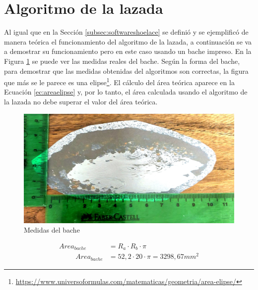 \section{Algoritmo de la lazada}
\label{sec:expshoelace}
Al igual que en la Sección \ref{subsec:softwareshoelace} se definió y se ejemplificó de manera teórica el funcionamiento del algoritmo de la lazada, a continuación se va a demostrar su funcionamiento pero en este caso usando un bache impreso. En la Figura \ref{fig:explazadamedidas} se puede ver las medidas reales del bache. Según la forma del bache, para demostrar que las medidas obtenidas del algoritmos son correctas, la figura que más se le parece es una elipse\footnote{\url{https://www.universoformulas.com/matematicas/geometria/area-elipse/}}. El cálculo del área teórica aparece en la Ecuación \ref{ec:areaelipse} y, por lo tanto, el área calculada usando el algoritmo de la lazada no debe superar el valor del área teórica. 

\begin{figure} [h!]
	\begin{center}
			\includegraphics[width=12cm]{figs/cap7/memidasbacheteorico.jpeg}
		\end{center}
	\caption{Medidas del bache}
	\label{fig:explazadamedidas}
\end{figure}


\begin{myequation}[h]
	\begin{align}
		Area_{bache} &= R_a \cdot R_b \cdot \pi 
		\nonumber\\
		\hspace{1cm}
		Area_{bache} &= 52,2 \cdot 20 \cdot \pi = 3298,67 mm^{2}
		\nonumber
	\end{align}
	\caption[Fórmula para calcular el área de una elipse]{Fórmula para calcular el área de una elipse}
	\label{ec:areaelipse}
\end{myequation}


